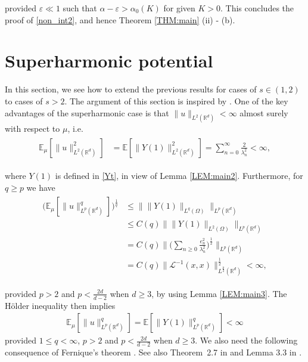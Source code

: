 \documentclass[%
11pt,  reqno]{amsart}
\theoremstyle{remarkstyle}
\newcommand{\1}{\hspace{0.2mm}\text{I}\hspace{0.2mm}}
\newcommand{\noi}{\noindent}
\newcommand{\R}{\mathbb{R}}
\newcommand{\E}{\mathbb{E}}
\renewcommand{\L}{\mathcal{L}}
\newcommand{\al}{\alpha}
\newcommand{\eps}{\varepsilon}
\newcommand{\ld}{\lambda}
\numberwithin{equation}{section}
\numberwithin{theorem}{section}
\begin{document}
	\noi 
	provided $\eps \ll 1$ such that $\al - \eps > \al_0 (K)$ for given $K > 0$.
	This concludes the proof of \eqref{non_int2}, and hence Theorem \ref{THM:main} (ii) - (b).
	
	
	
	\section{Superharmonic potential}
	\label{SEC:superharmonic}
	
	In this section,
	we see how to extend the previous results for cases of $s \in (1,2)$ to cases of $s > 2$.
	The argument of this section is inspired by \cite{LW22}.
	One of the key advantages of the superharmonic case is that $\| u\|_{L^2(\R^d)} < \infty$ almost surely with respect to $\mu$, i.e.
	\begin{align}
		\label{sup_L2}
		\begin{split}
			\E_{\mu} [\|u\|_{L^2(\R^d)}^2] 
			& = \E [\|Y(1)\|_{L^2(\R^d)}^2]  = \sum_{n=0}^\infty \frac2{\ld_n^2} < \infty,      
		\end{split}
	\end{align}
	
	\noi 
	where $Y(1)$ is defined in \eqref{Yt},  in view of Lemma \ref{LEM:main2}. Furthermore, for $q \ge p $ we have
	\begin{align*}
		\begin{split}
			\big(\E_{\mu} [\|u\|_{L^p(\R^d)}^q] \big)^{\frac1q}
			& \leq \big\|  \| Y(1) \|_{L^q (\Omega)} \big\|_{L^{p} ({\R^d})} \\
			& \leq C(q) \big\|  \| Y(1) \|_{L^2 (\Omega)} \big\|_{L^{p} ({\R^d})} \\
			& = C(q)\bigg\|  \Big( \sum_{n\ge 0} \frac{e_n^2}{\ld_n^2} \Big)^\frac12 \bigg\|_{L^{p} ({\R^d})} \\
			& = C(q)\| \L^{-1} (x,x)\|_{L^{\frac{p}2} (\R^d)}^{\frac12} < \infty,     
		\end{split}
	\end{align*}
	
	\noi 
	provided $p>2$ and $p<\frac{2d}{d-2}$ when $d\ge 3$, by using Lemma \ref{LEM:main3}. The H\"older inequality then implies 
	\begin{align} \label{sup_Lp}
		\E_{\mu} [\|u\|_{L^p(\R^d)}^q] = \E[\|Y(1)\|_{L^p(\R^d)}^q]<\infty
	\end{align}
	provided $1\leq q <\infty$, $p>2$ and $p<\frac{2d}{d-2}$ when $d\ge 3$. We also need the following consequence of Fernique's theorem \cite{Fernique75}.
	See also Theorem~2.7 in \cite{DZ14}
	and Lemma 3.3 in \cite{RSTW22}.
	
\end{document}

